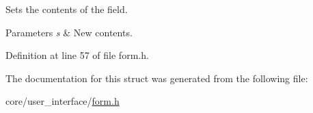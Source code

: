 Sets the contents of the field. 


\begin{DoxyParams}{Parameters}
{\em s} & New contents. \\
\hline
\end{DoxyParams}


Definition at line 57 of file form.\+h.



The documentation for this struct was generated from the following file\+:\begin{DoxyCompactItemize}
\item 
core/user\+\_\+interface/\hyperlink{form_8h}{form.\+h}\end{DoxyCompactItemize}
